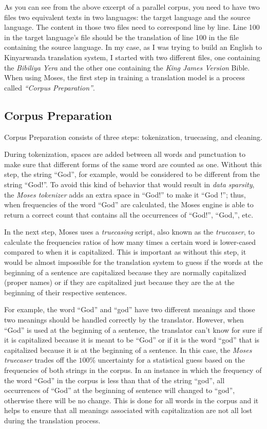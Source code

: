 As you can see from the above excerpt of a parallel corpus, you need to have two files two equivalent texts in two languages: the target language and the source language. The content in those two files need to correspond line by line. Line 100 in the target language's file should be the translation of line 100 in the file containing the source language. In my case, as I was trying to build an English to Kinyarwanda translation system, I started with two different files, one containing the \textit{Bibiliya Yera} and the other one containing the \textit{King James Version} Bible. When using Moses, the first step in training a translation model is a process called \textit{``Corpus Preparation''}.
\subsection{Corpus Preparation}
Corpus Preparation consists of three steps: tokenization, truecasing, and cleaning.

During tokenization, spaces are added between all words and punctuation to make sure that different forms of the same word are counted as one. Without this step, the string ``God'', for example,  would be considered to be different from the string ``God!''. To avoid this kind of behavior that would result in \textit{data sparsity}, the \textit{Moses tokenizer} adds an extra space  in ``God!'' to make it ``God !''; thus, when frequencies of the word ``God'' are calculated, the Moses engine is able to return a correct count that contains all the occurrences of ``God!'', ``God,'', etc.

In the next step, Moses uses a \textit{truecasing} script, also known as the \textit{truecaser}, to calculate the frequencies ratios of how many times a certain word is lower-cased compared to when it is capitalized. This is important as without this step, it would be almost impossible for the translation system to guess if the words at the beginning of a sentence are capitalized because they are normally capitalized (proper names) or if they are capitalized just because they are the at the beginning of their respective sentences.

For example, the word ``God'' and ``god'' have two different meanings and those two meanings should be handled correctly by the translator. However, when ``God'' is used at the beginning of a sentence, the translator can't know for sure if it is capitalized because it is meant to be ``God'' or if it is the word ``god'' that is capitalized because it is at the beginning of a sentence. In this case, the \textit{Moses truecaser} trades off the $100\%$ uncertainty for a statistical guess based on the frequencies of both strings in the corpus. In an instance in which the frequency of the word ``God'' in the corpus is less than that of the string ``god'', all occurrences of ``God'' at the beginning of sentence will changed to ``god'', otherwise there will be no change. This is done for all words in the corpus and it helps to ensure that all meanings associated with capitalization are not all lost during the translation process. 


